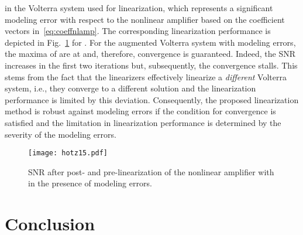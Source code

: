 \documentclass[10pt,twocolumn,twoside]{IEEEtran}
\begin{document}
in the Volterra system used for linearization, which represents
a significant modeling error with respect to the nonlinear amplifier
based on the coefficient vectors in~\eqref{eq:coeffnlamp}. The
corresponding linearization performance is depicted in Fig.~\ref{fig:snrb1:moderr}
for . For the augmented Volterra system with modeling errors, the maxima of
 are at  and, therefore, convergence is guaranteed.
Indeed, the SNR increases in the first two iterations but, subsequently,
the convergence stalls. This stems from the
fact that the linearizers effectively linearize a \emph{different} Volterra
system, i.e., they converge to a different solution and the linearization
performance is limited by this deviation. Consequently, the
proposed linearization method is robust against modeling errors if the
condition for convergence is satisfied and the limitation in linearization
performance is determined by the severity of the modeling errors.

\begin{figure}[!t]\centering \texttt{[image: hotz15.pdf]}\caption{SNR after post- and pre-linearization of the nonlinear amplifier with 
	in the presence of modeling errors.}\label{fig:snrb1:moderr}\end{figure}



\section{Conclusion}
	\label{conclusion}
\end{document}

